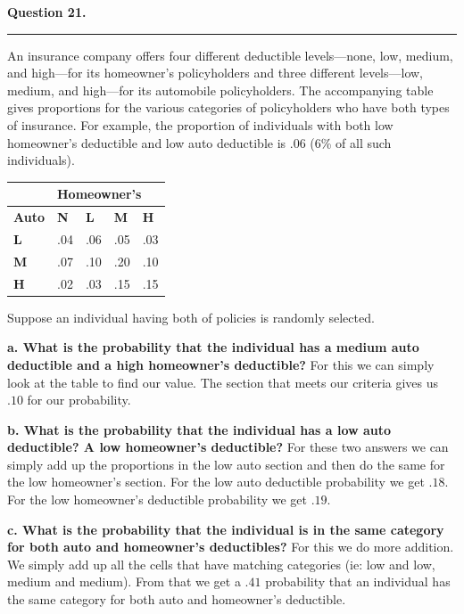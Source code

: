 \textbf{Question 21.} \\
\hrule 

An insurance company offers four different deductible levels—none, low, medium, and high—for its homeowner’s policyholders and three different levels—low, medium, and high—for its automobile policyholders. The accompanying table gives proportions for the various categories of policyholders who have both types of insurance. For example, the proportion of individuals with both low homeowner’s deductible and low auto deductible is .06 (6\% of all such individuals). \newline 

\begin{table}[h]
\begin{tabular}{@{}lllll@{}}
\toprule
 & \multicolumn{4}{l}{\textbf{Homeowner's}} \\ \midrule
\textbf{Auto} & \textbf{N} & \textbf{L} & \textbf{M} & \textbf{H} \\
\textbf{L} & .04 & .06 & .05 & .03 \\
\textbf{M} & .07 & .10 & .20 & .10 \\
\textbf{H} & .02 & .03 & .15 & .15 \\ \bottomrule
\end{tabular}
\end{table}

Suppose an individual having both of policies is randomly selected.

\textbf{a. What is the probability that the individual has a medium auto deductible and a high homeowner's deductible?} \newline
For this we can simply look at the table to find our value. The section that meets our criteria gives us $\boxed{.10}$ for our probability.

\textbf{b. What is the probability that the individual has a low auto deductible? A low homeowner's deductible?} \newline 
For these two answers we can simply add up the proportions in the low auto section and then do the same for the low homeowner's section. For the low auto deductible probability we get $\boxed{.18}$. For the low homeowner's deductible probability we get $\boxed{.19}$. 

\textbf{c. What is the probability that the individual is in the same category for both auto and homeowner's deductibles?}
For this we do more addition. We simply add up all the cells that have matching categories (ie: low and low, medium and medium). From that we get a $\boxed{.41}$ probability that an individual has the same category for both auto and homeowner's deductible.

